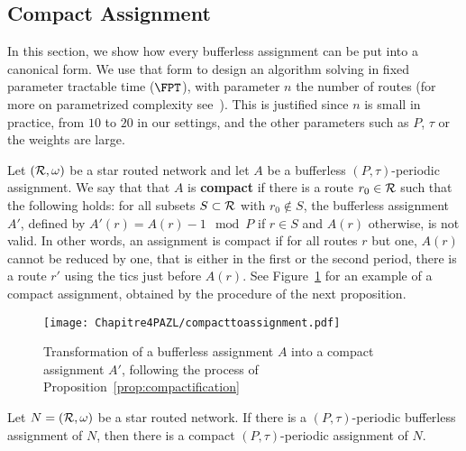 \subsection{Compact Assignment}

In this section, we show how every bufferless assignment can be put into a canonical form.
We use that form to design an algorithm solving \pma in fixed parameter tractable time ($\FPT$), with parameter $n$ the number of routes (for more on parametrized complexity see~\cite{downey2012parameterized}). This is justified since $n$ is small in practice, from $10$ to $20$ in our settings, and the other parameters such as $P$, $\tau$ or the weights are large.

Let $({\cal R},\omega)$ be a star routed network and let $A$ be a bufferless $(P,\tau)$-periodic assignment.
We say that that $A$ is \textbf{compact} if there is a route $r_0 \in \cal{R}$ such that the following holds: for all subsets $S\subset \cal{R}$ with $r_0 \notin S$, the bufferless assignment $A'$, defined by $A'(r) = A(r) - 1 \mod P$ if $r \in S$ and $A(r)$ otherwise, is not valid. In other words, an assignment is compact if for all routes $r$ but one, $A(r)$ cannot be reduced by one, that is either in the first or the second period, there is a route $r'$ using the tics just before $A(r)$. See Figure~\ref{fig:compact} for an example of a compact assignment, obtained by the procedure of the next proposition. 
  \begin{figure}
      \begin{center} 
      \texttt{[image: Chapitre4PAZL/compacttoassignment.pdf]}
      \end{center}
      \caption{Transformation of a bufferless assignment $A$ into a compact assignment $A'$, following the process of Proposition~\ref{prop:compactification}}
      \label{fig:compact}
      \end{figure}
\begin{proposition}\label{prop:compactification}
Let $N = ({\cal R}, \omega)$ be a star routed network. If there is a $(P,\tau)$-periodic bufferless assignment of $N$, then there is a compact $(P,\tau)$-periodic assignment of $N$.
\end{proposition}
